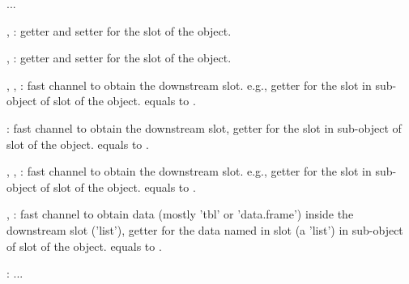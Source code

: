 \documentclass[letterpaper]{book}
\begin{document}
\begin{Description}\relax
...

, : getter and setter
for the  slot of the object.

, : getter and setter
for the  slot of the object.

, , :
fast channel to obtain
the downstream slot. e.g., getter
for the  slot in sub-object
of  slot of the object.
equals to .

: fast channel to obtain
the downstream slot, getter
for the  slot in sub-object
of  slot of the object.
equals to .

, , :
fast channel to obtain
the downstream slot. e.g., getter
for the  slot in sub-object
of  slot of the object.
equals to .

, :
fast channel to obtain
data (mostly 'tbl' or 'data.frame') inside the downstream slot ('list'), getter
for the data named  in
 slot (a 'list') in sub-object
of  slot of the object.
equals to .

: ...
\end{Description}
%
\end{document}
